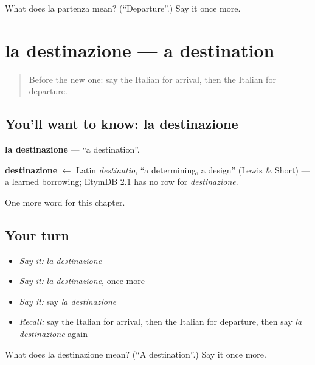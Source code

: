 \begin{tcolorbox}[breakable,colback=teal!4,colframe=teal!35!black,title={Before you move on}]
What does la partenza mean? (\textquotedblleft{}Departure\textquotedblright{}.) Say it once more.
\end{tcolorbox}
\section[la destinazione]{la destinazione — a destination}

\label{lesson:IT-C171-destinazione}



\begin{quote}
Before the new one: say the Italian for arrival, then the Italian for departure.
\end{quote}

\subsection*{You'll want to know: la destinazione}
\textbf{la destinazione} — \textquotedblleft{}a destination\textquotedblright{}.

\begin{cousinweb}
\textbf{destinazione} $\leftarrow$ Latin \emph{destinatio}, \textquotedblleft{}a determining, a design\textquotedblright{} (Lewis \& Short) — a learned borrowing; EtymDB 2.1 has no row for \emph{destinazione}.
\end{cousinweb}

\begin{grammarlens}[title={What you've built}]
One more word for this chapter.
\end{grammarlens}

\subsection*{Your turn}
\begin{itemize}
\raggedright
  \item \emph{Say it:} \emph{la destinazione}
  \item \emph{Say it:} \emph{la destinazione}, once more
  \item \emph{Say it:} say \emph{la destinazione}
  \item \emph{Recall:} say the Italian for arrival, then the Italian for departure, then say \emph{la destinazione} again
\end{itemize}

\begin{tcolorbox}[breakable,colback=teal!4,colframe=teal!35!black,title={Before you move on}]
What does la destinazione mean? (\textquotedblleft{}A destination\textquotedblright{}.) Say it once more.
\end{tcolorbox}
